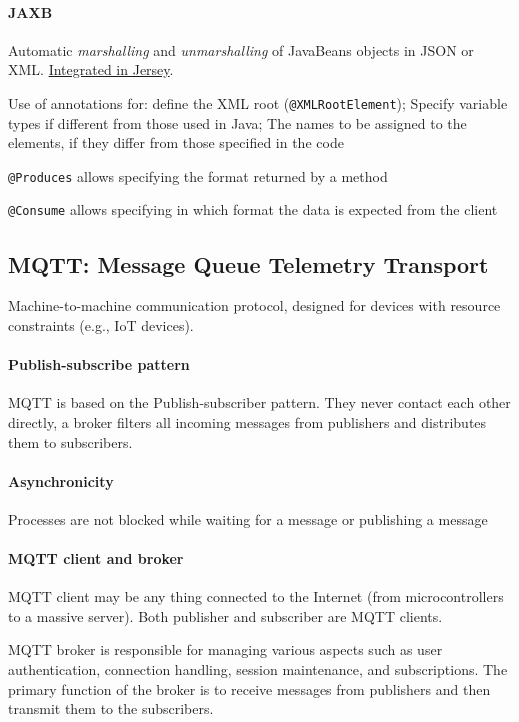 \paragraph{JAXB}
Automatic \textit{marshalling} and \textit{unmarshalling} of JavaBeans objects in JSON or XML. \uline{Integrated in Jersey}.

Use of annotations for: define the XML root (\texttt{@XMLRootElement}); Specify variable types if different from those used in Java; The names to be assigned to the elements, if they differ from those specified in the code

\texttt{@Produces} allows specifying the format returned by a method

\texttt{@Consume} allows specifying in which format the data is expected from the client

\subsection{MQTT: Message Queue Telemetry Transport}
Machine-to-machine communication protocol, designed for devices with resource constraints (e.g., IoT devices).

\paragraph{Publish-subscribe pattern}
MQTT is based on the Publish-subscriber pattern. They never contact each other directly, a broker filters all incoming messages from publishers and distributes them to subscribers.

\paragraph{Asynchronicity}
Processes are not blocked while waiting for a message or publishing a message

\paragraph{MQTT client and broker}
MQTT client may be any thing connected to the Internet (from microcontrollers to a massive server). Both publisher and subscriber are MQTT clients.

MQTT broker is responsible for managing various aspects such as user authentication, connection handling, session maintenance, and subscriptions. The primary function of the broker is to receive messages from publishers and then transmit them to the subscribers.

